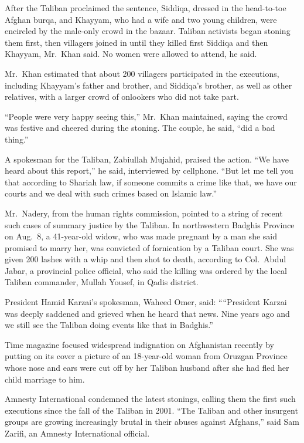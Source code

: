 ﻿\documentclass[12pt]{article}
\begin{document}
After the Taliban proclaimed the sentence, Siddiqa, dressed in the head-to-toe Afghan burqa, and
Khayyam, who had a wife and two young children, were encircled by the male-only crowd in the bazaar.
Taliban activists began stoning them first, then villagers joined in until they killed first Siddiqa
and then Khayyam, Mr.~Khan said. No women were allowed to attend, he said.

Mr.~Khan estimated that about 200 villagers participated in the executions, including Khayyam's
father and brother, and Siddiqa's brother, as well as other relatives, with a larger crowd of
onlookers who did not take part.

``People were very happy seeing this,'' Mr.~Khan maintained, saying the crowd was festive and
cheered during the stoning. The couple, he said, ``did a bad thing.''

A spokesman for the Taliban, Zabiullah Mujahid, praised the action. ``We have heard about this
report,'' he said, interviewed by cellphone. ``But let me tell you that according to Shariah law, if
someone commits a crime like that, we have our courts and we deal with such crimes based on Islamic
law.''

Mr.~Nadery, from the human rights commission, pointed to a string of recent such cases of summary
justice by the Taliban. In northwestern Badghis Province on Aug.~8, a 41-year-old widow, who was
made pregnant by a man she said promised to marry her, was convicted of fornication by a Taliban
court. She was given 200 lashes with a whip and then shot to death, according to Col.~Abdul Jabar, a
provincial police official, who said the killing was ordered by the local Taliban commander, Mullah
Yousef, in Qadis district.

President Hamid Karzai's spokesman, Waheed Omer, said: ````President Karzai was deeply saddened and
grieved when he heard that news. Nine years ago and we still see the Taliban doing events like that
in Badghis.''

Time magazine focused widespread indignation on Afghanistan recently by putting on its cover a
picture of an 18-year-old woman from Oruzgan Province whose nose and ears were cut off by her
Taliban husband after she had fled her child marriage to him.

Amnesty International condemned the latest stonings, calling them the first such executions since
the fall of the Taliban in 2001. ``The Taliban and other insurgent groups are growing increasingly
brutal in their abuses against Afghans,'' said Sam Zarifi, an Amnesty International official.
\end{document}
